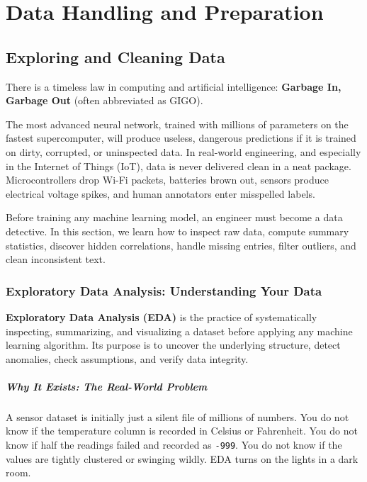 \chapter{Data Handling and Preparation}\label{ch:data_handling}
\section{Exploring and Cleaning Data}\label{sec:exploring_cleaning}

There is a timeless law in computing and artificial intelligence: \textbf{Garbage In, Garbage Out} (often abbreviated as GIGO). 

The most advanced neural network, trained with millions of parameters on the fastest supercomputer, will produce useless, dangerous predictions if it is trained on dirty, corrupted, or uninspected data. In real-world engineering, and especially in the Internet of Things (IoT), data is never delivered clean in a neat package. Microcontrollers drop Wi-Fi packets, batteries brown out, sensors produce electrical voltage spikes, and human annotators enter misspelled labels.

Before training any machine learning model, an engineer must become a data detective. In this section, we learn how to inspect raw data, compute summary statistics, discover hidden correlations, handle missing entries, filter outliers, and clean inconsistent text.

\subsection{Exploratory Data Analysis: Understanding Your Data}

\begin{keyidea}
\textbf{Exploratory Data Analysis (EDA)} is the practice of systematically inspecting, summarizing, and visualizing a dataset before applying any machine learning algorithm. Its purpose is to uncover the underlying structure, detect anomalies, check assumptions, and verify data integrity.
\end{keyidea}

\paragraph{Why It Exists: The Real-World Problem}
A sensor dataset is initially just a silent file of millions of numbers. You do not know if the temperature column is recorded in Celsius or Fahrenheit. You do not know if half the readings failed and recorded as \texttt{-999}. You do not know if the values are tightly clustered or swinging wildly. EDA turns on the lights in a dark room.

